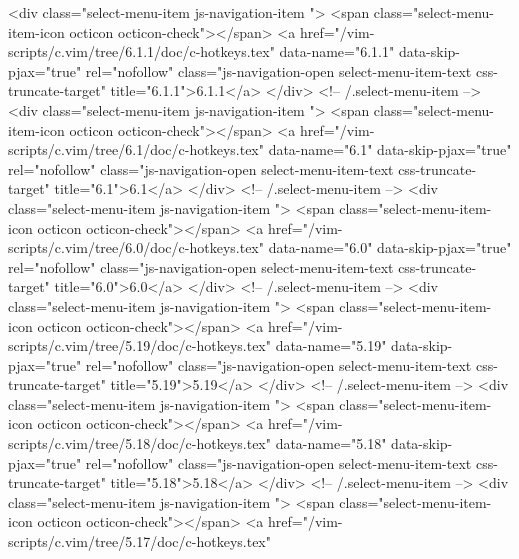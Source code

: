             <div class="select-menu-item js-navigation-item ">
              <span class="select-menu-item-icon octicon octicon-check"></span>
              <a href="/vim-scripts/c.vim/tree/6.1.1/doc/c-hotkeys.tex"
                 data-name="6.1.1"
                 data-skip-pjax="true"
                 rel="nofollow"
                 class="js-navigation-open select-menu-item-text css-truncate-target"
                 title="6.1.1">6.1.1</a>
            </div> <!-- /.select-menu-item -->
            <div class="select-menu-item js-navigation-item ">
              <span class="select-menu-item-icon octicon octicon-check"></span>
              <a href="/vim-scripts/c.vim/tree/6.1/doc/c-hotkeys.tex"
                 data-name="6.1"
                 data-skip-pjax="true"
                 rel="nofollow"
                 class="js-navigation-open select-menu-item-text css-truncate-target"
                 title="6.1">6.1</a>
            </div> <!-- /.select-menu-item -->
            <div class="select-menu-item js-navigation-item ">
              <span class="select-menu-item-icon octicon octicon-check"></span>
              <a href="/vim-scripts/c.vim/tree/6.0/doc/c-hotkeys.tex"
                 data-name="6.0"
                 data-skip-pjax="true"
                 rel="nofollow"
                 class="js-navigation-open select-menu-item-text css-truncate-target"
                 title="6.0">6.0</a>
            </div> <!-- /.select-menu-item -->
            <div class="select-menu-item js-navigation-item ">
              <span class="select-menu-item-icon octicon octicon-check"></span>
              <a href="/vim-scripts/c.vim/tree/5.19/doc/c-hotkeys.tex"
                 data-name="5.19"
                 data-skip-pjax="true"
                 rel="nofollow"
                 class="js-navigation-open select-menu-item-text css-truncate-target"
                 title="5.19">5.19</a>
            </div> <!-- /.select-menu-item -->
            <div class="select-menu-item js-navigation-item ">
              <span class="select-menu-item-icon octicon octicon-check"></span>
              <a href="/vim-scripts/c.vim/tree/5.18/doc/c-hotkeys.tex"
                 data-name="5.18"
                 data-skip-pjax="true"
                 rel="nofollow"
                 class="js-navigation-open select-menu-item-text css-truncate-target"
                 title="5.18">5.18</a>
            </div> <!-- /.select-menu-item -->
            <div class="select-menu-item js-navigation-item ">
              <span class="select-menu-item-icon octicon octicon-check"></span>
              <a href="/vim-scripts/c.vim/tree/5.17/doc/c-hotkeys.tex"
